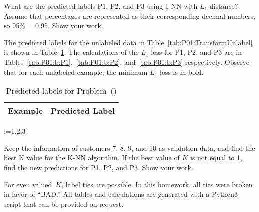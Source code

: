 \FloatBarrier%
\begin{subproblem}
  What are the predicted labels P1, P2, and P3 using 1-NN with $L_1$ distance? Assume that percentages are represented as their corresponding decimal numbers, so 95\% = 0.95. Show your work.
\end{subproblem}

The predicted labels for the unlabeled data in Table~\ref{tab:P01:TransformUnlabel} is shown in Table~\ref{tab:P01:b:PredictedLabels}.  The calculations of the $L_1$ loss for P1, P2, and P3 are in Tables~\ref{tab:P01:b:P1},~\ref{tab:P01:b:P2}, and~\ref{tab:P01:b:P3} respectively.  Observe that for each unlabeled example, the minimum $L_1$ loss is in bold.

\begin{table}[h]
  \centering
  \caption{Predicted labels for Problem~()}\label{tab:P01:b:PredictedLabels}
  \begin{tabular}{|c|c|}
    \hline
    Example & Predicted Label \\\hline\hline
    
  \end{tabular}
\end{table}

\@for\id:={1,2,3}

\FloatBarrier%
\begin{subproblem}
  Keep the information of customers 7, 8, 9, and 10 as validation data, and find the best K value for the K-NN algorithm. If the best value of $K$ is not equal to 1, find the new predictions for P1, P2, and P3. Show your work.
\end{subproblem}

For even valued~$K$, label ties are possible.  In this homework, all ties were broken in favor of ``BAD.''  All tables and calculations are generated with a Python3 script that can be provided on request.

